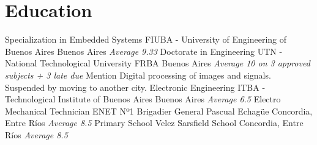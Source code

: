 \section{Education}
 { Specialization in Embedded Systems } { FIUBA - University of Engineering of Buenos Aires } { Buenos Aires          } { \textit { Average 9.33                                   } } { }
 { Doctorate in Engineering           } { UTN - National Technological University  FRBA     } { Buenos Aires          } { \textit { Average 10 on 3 approved subjects + 3 late due } } { Mention Digital processing of images and signals. Suspended by moving to another city. }
 { Electronic Engineering             } { ITBA - Technological Institute of Buenos Aires    } { Buenos Aires          } { \textit { Average 6.5                                    } } { }
 { Electro Mechanical Technician      } { ENET Nº1 Brigadier General Pascual Echagüe        } { Concordia, Entre Ríos } { \textit { Average 8.5                                    } } { }
 { Primary School                     } { Velez Sarsfield School                            } { Concordia, Entre Ríos } { \textit { Average 8.5                                    } } { }

